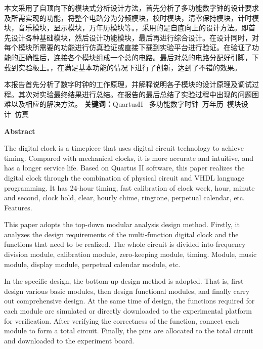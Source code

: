 \documentclass[12pt]{article}
\begin{document}
本文采用了自顶向下的模块式分析设计方法，首先分析了多功能数字钟的设计要求及所需实现的功能，将整个电路分为分频模块，校时模块，清零保持模块，计时模块，音乐模块，显示模块，万年历模块等。，采用的是自底向上的设计方法。即首先设计各种基础模块，然后设计功能模块，最后再进行综合设计。在设计同时，对每个模块所需要的功能进行仿真验证或直接下载到实验平台进行验证。在验证了功能的正确性后，连接各个模块组成一个总的电路。最后对总的电路分配好引脚，下载到实验板上。，在满足基本功能的情况下进行了创新，达到了不错的效果。\par
本报告首先分析了数字时钟的工作原理，并解释说明各子模块的设计原理及调试过程。其次对实验最终结果进行总结。在报告的最后总结了实验过程中出现的问题困难以及相应的解决方法。\newline\newline
\textbf{关键词：}QuartusII \ 多功能数字时钟\ 
万年历\ 
模块设计\ 
仿真
\newpage
\thispagestyle{empty}
\begin{center}\textbf{Abstract}\end{center}\par
The digital clock is a timepiece that uses digital circuit technology to achieve timing. Compared with mechanical clocks, it is more accurate and intuitive, and has a longer service life. Based on Quartus II software, this paper realizes the digital clock through the combination of physical circuit and VHDL language programming. It has 24-hour timing, fast calibration of clock week, hour, minute and second, clock hold, clear, hourly chime, ringtone, perpetual calendar, etc. Features.

This paper adopts the top-down modular analysis design method. Firstly, it analyzes the design requirements of the multi-function digital clock and the functions that need to be realized. The whole circuit is divided into frequency division module, calibration module, zero-keeping module, timing. Module, music module, display module, perpetual calendar module, etc.

In the specific design, the bottom-up design method is adopted. That is, first design various basic modules, then design functional modules, and finally carry out comprehensive design. At the same time of design, the functions required for each module are simulated or directly downloaded to the experimental platform for verification. After verifying the correctness of the function, connect each module to form a total circuit. Finally, the pins are allocated to the total circuit and downloaded to the experiment board.
\end{document}
